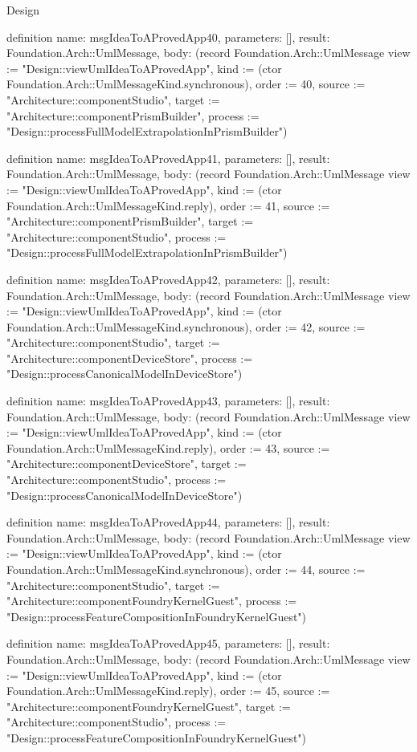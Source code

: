\begin{lexlean}{Design}
\begin{semanticmodule}
definition{
  name: msgIdeaToAProvedApp40,
  parameters: [],
  result: Foundation.Arch::UmlMessage,
  body: (record Foundation.Arch::UmlMessage {view := "Design::viewUmlIdeaToAProvedApp", kind := (ctor Foundation.Arch::UmlMessageKind.synchronous), order := 40, source := "Architecture::componentStudio", target := "Architecture::componentPrismBuilder", process := "Design::processFullModelExtrapolationInPrismBuilder"})
}

definition{
  name: msgIdeaToAProvedApp41,
  parameters: [],
  result: Foundation.Arch::UmlMessage,
  body: (record Foundation.Arch::UmlMessage {view := "Design::viewUmlIdeaToAProvedApp", kind := (ctor Foundation.Arch::UmlMessageKind.reply), order := 41, source := "Architecture::componentPrismBuilder", target := "Architecture::componentStudio", process := "Design::processFullModelExtrapolationInPrismBuilder"})
}

definition{
  name: msgIdeaToAProvedApp42,
  parameters: [],
  result: Foundation.Arch::UmlMessage,
  body: (record Foundation.Arch::UmlMessage {view := "Design::viewUmlIdeaToAProvedApp", kind := (ctor Foundation.Arch::UmlMessageKind.synchronous), order := 42, source := "Architecture::componentStudio", target := "Architecture::componentDeviceStore", process := "Design::processCanonicalModelInDeviceStore"})
}

definition{
  name: msgIdeaToAProvedApp43,
  parameters: [],
  result: Foundation.Arch::UmlMessage,
  body: (record Foundation.Arch::UmlMessage {view := "Design::viewUmlIdeaToAProvedApp", kind := (ctor Foundation.Arch::UmlMessageKind.reply), order := 43, source := "Architecture::componentDeviceStore", target := "Architecture::componentStudio", process := "Design::processCanonicalModelInDeviceStore"})
}

definition{
  name: msgIdeaToAProvedApp44,
  parameters: [],
  result: Foundation.Arch::UmlMessage,
  body: (record Foundation.Arch::UmlMessage {view := "Design::viewUmlIdeaToAProvedApp", kind := (ctor Foundation.Arch::UmlMessageKind.synchronous), order := 44, source := "Architecture::componentStudio", target := "Architecture::componentFoundryKernelGuest", process := "Design::processFeatureCompositionInFoundryKernelGuest"})
}

definition{
  name: msgIdeaToAProvedApp45,
  parameters: [],
  result: Foundation.Arch::UmlMessage,
  body: (record Foundation.Arch::UmlMessage {view := "Design::viewUmlIdeaToAProvedApp", kind := (ctor Foundation.Arch::UmlMessageKind.reply), order := 45, source := "Architecture::componentFoundryKernelGuest", target := "Architecture::componentStudio", process := "Design::processFeatureCompositionInFoundryKernelGuest"})
}


\end{semanticmodule}
\end{lexlean}
